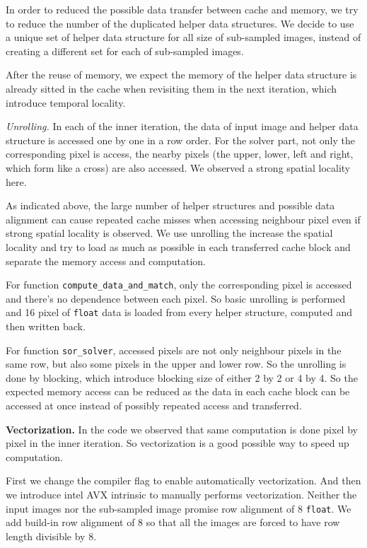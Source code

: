 \documentclass[letterpaper]{article}
\newcommand{\mypar}[1]{{\bf #1.}}
\begin{document}
In order to reduced the possible data transfer between cache and 
memory, we try to reduce the number of the duplicated helper data 
structures. We decide to use a unique set of helper data structure 
for all size of sub-sampled images, instead of creating a different 
set for each of sub-sampled images. 

After the reuse of memory, we expect the memory of the helper data structure 
is already sitted in the cache when revisiting them in the next iteration, 
which introduce temporal locality. 

\emph{Unrolling.} In each of the inner iteration, the data of input image 
and helper data structure is accessed one by one in a row order. For 
the solver part, not only the corresponding pixel is access, the nearby 
pixels (the upper, lower, left and right, which form like a cross) are also 
accessed. We observed a strong spatial locality here. 

As indicated above, the large number of helper structures and possible 
data alignment can cause repeated cache misses when accessing neighbour 
pixel even if strong spatial locality is observed. We use unrolling the 
increase the spatial locality and try to load as much as possible in 
each transferred cache block and separate the memory access and computation. 

For function \texttt{compute\_data\_and\_match}, only the corresponding 
pixel is accessed and there's no dependence between each pixel. So 
basic unrolling is performed and 16 pixel of \texttt{float} data is loaded 
from every helper structure, computed and then written back. 

For function \texttt{sor\_solver}, accessed pixels are not only neighbour 
pixels in the same row, but also some pixels in the upper and lower row. 
So the unrolling is done by blocking, which introduce blocking size of 
either 2 by 2 or 4 by 4. So the expected memory access can be reduced 
as the data in each cache block can be accessed at once instead of 
possibly repeated access and transferred. 


\mypar{Vectorization}
In the code we observed that same computation is done pixel by pixel in 
the inner iteration. So vectorization is a good possible way to speed 
up computation. 

First we change the compiler flag to enable automatically vectorization. 
And then we introduce intel AVX \cite{firasta2008intel} intrinsic to 
manually performs vectorization. Neither the input images nor the 
sub-sampled image promise row alignment of 8 \texttt{float}. We add 
build-in row alignment of 8 so that all the images are forced to have 
row length divisible by 8. 
\end{document}
